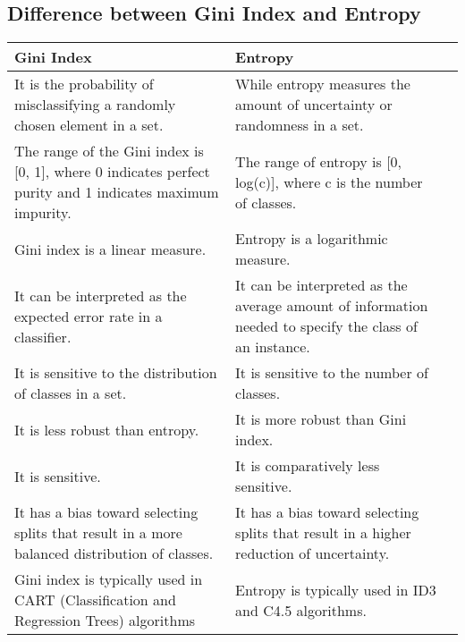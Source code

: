     \subsection{Difference between Gini Index and Entropy}
        \begin{center}
            \begin{tabularx}{0.8\textwidth} { 
                | >{\raggedright\arraybackslash}X 
                | >{\raggedright\arraybackslash}X 
                | >{\raggedright\arraybackslash}X | } 
            \hline
            Gini Index & Entropy \\ 
            \hline
            It is the probability of misclassifying a randomly chosen element in a set.	& While entropy measures the amount of uncertainty or randomness in a set.\\
            \hline
            The range of the Gini index is [0, 1], where 0 indicates perfect purity and 1 indicates maximum impurity. & The range of entropy is [0, log(c)], where c is the number of classes.\\
            \hline
            Gini index is a linear measure.	& Entropy is a logarithmic measure. \\ 
            \hline
            It can be interpreted as the expected error rate in a classifier. & It can be interpreted as the average amount of information needed to specify the class of an instance. \\
            \hline
            It is sensitive to the distribution of classes in a set. & It is sensitive to the number of classes. \\
            \hline
            It is less robust than entropy.	& It is more robust than Gini index.\\
            \hline
            It is sensitive. & It is comparatively less sensitive.\\
            \hline 
            It has a bias toward selecting splits that result in a more balanced distribution of classes. & It has a bias toward selecting splits that result in a higher reduction of uncertainty.\\
            \hline
            Gini index is typically used in CART (Classification and Regression Trees) algorithms & Entropy is typically used in ID3 and C4.5 algorithms. \\
            \hline
            \end{tabularx}
        \end{center}
